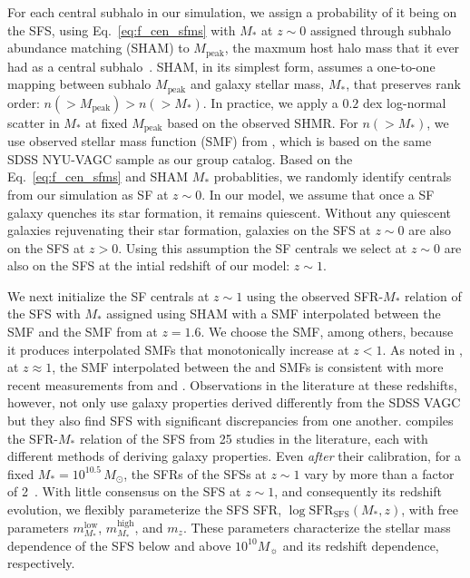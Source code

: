 \documentclass[12pt, letterpaper, preprint, tighten]{aastex62}
\newcommand{\todo}[1]{{\bf \textcolor{red}{#1}}}
\begin{document}
For each central subhalo in our simulation, we assign a probability of it 
being on the SFS, using Eq.~\ref{eq:f_cen_sfms} with $M_*$ at $z \sim 0$ 
assigned through subhalo abundance matching (SHAM) to $M_\mathrm{peak}$, 
the maxmum host halo mass that it ever had as a central subhalo~\citep{conroy2006,vale2006,yang2009,wetzel2012,leja2013,wetzel2013,wetzel2014,hahn2017}. 
SHAM, in its simplest form, assumes a one-to-one mapping between subhalo 
$M_\mathrm{peak}$ and galaxy stellar mass, $M_*$, that preserves rank 
order: $n({>}M_\mathrm{peak}) > n({>}M_*)$. In practice, we apply a $0.2$ 
dex log-normal scatter in $M_*$ at fixed $M_\mathrm{peak}$ based on the 
observed SHMR. For $n({>}M_*)$, we use observed stellar mass function (SMF) 
from \cite{li2009}, which is based on the same SDSS NYU-VAGC sample as our 
group catalog. Based on the Eq.~\ref{eq:f_cen_sfms} and SHAM $M_*$ probablities, 
we randomly identify centrals from our simulation as SF at $z \sim 0$. 
In our model, we assume that once a SF galaxy quenches its star formation, 
it remains quiescent.  %
Without any quiescent galaxies rejuvenating their star formation, galaxies
on the SFS at $z\sim0$ are also on the SFS at $z > 0$. Using this assumption
the SF centrals we select at $z \sim 0$ are also on the SFS at the intial
redshift of our model: $z \sim 1$. 

We next initialize the SF centrals at $z\sim1$ using the observed SFR-$M_*$ 
relation of the SFS with $M_*$ assigned using SHAM with a SMF interpolated
between the \cite{li2009} SMF and the SMF from \cite{marchesini2009} at 
$z = 1.6$. We choose the \cite{marchesini2009} SMF, among others, because it 
produces interpolated SMFs that monotonically increase at $z < 1$. As noted 
in \cite{hahn2017}, at $z \approx 1$, the SMF interpolated between the 
\cite{li2009} and \cite{marchesini2009} SMFs is consistent with more recent 
measurements from \cite{muzzin2013} and \cite{ilbert2013}. Observations in 
the literature at these redshifts, however, not only use galaxy properties 
derived differently from the SDSS VAGC but they also find SFS with significant 
discrepancies from one another. \cite{speagle2014} compiles the SFR-$M_*$ 
relation of the SFS from 25 studies in the literature, each with different 
methods of deriving galaxy properties. Even \emph{after} their calibration, 
for a fixed $M_* = 10^{10.5}\, M_\odot$, the SFRs of the SFSs at $z \sim 1$ 
vary by more than a factor of 2~\citep[see Figure 2 of][]{speagle2014}. 
With little consensus on the SFS at $z\sim1$, and consequently its redshift
evolution, we flexibly parameterize the SFS SFR, 
$\log\mathrm{SFR}_\mathrm{SFS}(M_*, z)$, 
with free parameters $m^\mathrm{low}_{M_*}$, $m^\mathrm{high}_{M_*}$, and 
$m_z$. These parameters characterize the stellar mass dependence of the SFS 
below and above $10^{10} M_\sun$ and its redshift dependence, respectively. 
\end{document}
